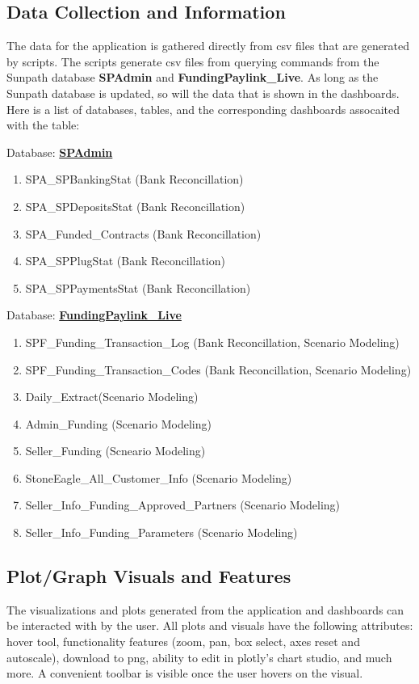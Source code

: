 \documentclass[titlepage]{article}
\begin{document}
\subsection{Data Collection and Information}
The data for the application is gathered directly from csv files that are generated by scripts. The scripts generate csv files from querying commands from the Sunpath database \textbf{SPAdmin} and \textbf{FundingPaylink\_Live}. As long as the Sunpath database is updated, so will the data that is shown in the dashboards. Here is a list of databases, tables, and the corresponding dashboards assocaited with the table:

Database: \underline{\textbf{SPAdmin}}
\begin{enumerate}
	\item SPA\_SPBankingStat (Bank Reconcillation)
	\item SPA\_SPDepositsStat (Bank Reconcillation)
	\item SPA\_Funded\_Contracts (Bank Reconcillation)
	\item SPA\_SPPlugStat (Bank Reconcillation)
	\item SPA\_SPPaymentsStat (Bank Reconcillation)
\end{enumerate}

Database: \underline{\textbf{FundingPaylink\_Live}}
	\begin{enumerate}
		\item SPF\_Funding\_Transaction\_Log (Bank Reconcillation, Scenario Modeling)
		\item SPF\_Funding\_Transaction\_Codes (Bank Reconcillation, Scenario Modeling)
		\item Daily\_Extract(Scenario Modeling)
		\item Admin\_Funding (Scenario Modeling)
		\item Seller\_Funding (Scneario Modeling)
		\item StoneEagle\_All\_Customer\_Info (Scenario Modeling)
		\item Seller\_Info\_Funding\_Approved\_Partners (Scenario Modeling)
		\item Seller\_Info\_Funding\_Parameters (Scenario Modeling)
	\end{enumerate}
	
\subsection{Plot/Graph Visuals and Features}
The visualizations and plots generated from the application and dashboards can be interacted with by the user. All plots and visuals have the following attributes: hover tool, functionality features (zoom, pan, box select, axes reset and autoscale), download to png, ability to edit in plotly's chart studio, and much more. A convenient toolbar is visible once the user hovers on the visual. 
\end{document}
